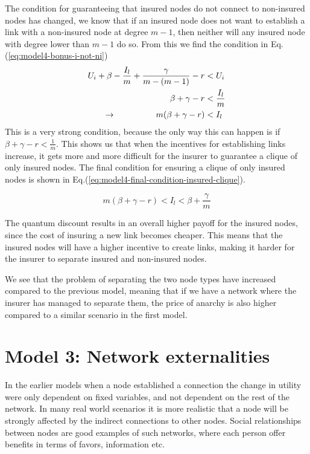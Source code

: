 The condition for guaranteeing that insured nodes do not connect to non-insured nodes has changed, we know that if an insured node does not want to establish a link with a non-insured node at degree $m-1$, then neither will any insured node with degree lower than $m-1$ do so. From this we find the condition in Eq.(\ref{eq:model4-bonus-i-not-ni})
\begin{eqnarray}
U_{i}+\beta-\frac{I_{l}}{m}+\frac{\gamma}{m-(m-1)}-r&<U_{i} \nonumber \\ 
\beta+\gamma-r&<\frac{I_{l}}{m}\nonumber \\ 
\llap{$\rightarrow$\hspace{50pt}}m(\beta +\gamma-r)&<I_{l}\nonumber
\label{eq:model4-bonus-i-not-ni}
\end{eqnarray}
This is a very strong condition, because the only way this can happen is if $\beta+\gamma-r<\frac{1}{m}$.  This shows us that when the incentives for establishing links increase, it gets more and more difficult for the insurer to guarantee a clique of only insured nodes. 
The final condition for ensuring a clique of only insured nodes is shown in Eq.(\ref{eq:model4-final-condition-insured-clique}).

\begin{equation}
m(\beta +\gamma-r)<I_{l}<\beta+\frac{\gamma}{m}
\label{eq:model4-final-condition-insured-clique}
\end{equation}

The quantum discount results in an overall higher payoff for the insured nodes, since the cost of insuring a new link becomes cheaper. This means that the insured nodes will have a higher incentive to create links, making it harder for the insurer to separate insured and non-insured nodes.

We see that the problem of separating the two node types have increased compared to the previous model, meaning that if we have a network where the insurer has managed to separate them, the price of anarchy is also higher compared to a similar scenario in the first model. 

\section{Model 3: Network externalities}
In the earlier models when a node established a connection the change in utility were only dependent on fixed variables, and not dependent on the rest of the network. In many real world scenarios it is more realistic that a node will be strongly affected by the indirect connections to other nodes. Social relationships between nodes are good examples of such networks, where each person offer benefits in terms of favors, information etc. 

